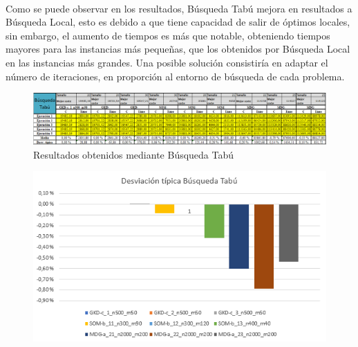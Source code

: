 \documentclass{article}
\begin{document}
			\paragraph{}Como se puede observar en los resultados, Búsqueda Tabú mejora en resultados a Búsqueda Local, esto es debido a que tiene capacidad de salir de óptimos locales, sin embargo, el aumento de tiempos es más que notable, obteniendo tiempos mayores para las instancias más pequeñas, que los obtenidos por Búsqueda Local en las instancias más grandes. Una posible solución consistiría en adaptar el número de iteraciones, en proporción al entorno de búsqueda de cada problema.
			
			\begin{figure}[H]
				
				\centering
				\includegraphics[scale=0.4]{img/btabuResult}
				\caption{Resultados obtenidos mediante Búsqueda Tabú}
				
			\end{figure}
		
			\begin{figure}[H]
				
				\centering
				\includegraphics[scale=0.4]{img/DTBtabu}
				
			\end{figure}
		
\end{document}
